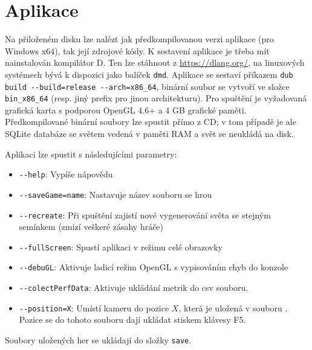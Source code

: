 \vfill


\chapter{Aplikace} \label{ch:app}
Na přiloženém disku lze nalézt jak předkompilovanou verzi aplikace (pro Windows x64), tak její zdrojové kódy. K sestavení aplikace je třeba mít nainstalován kompilátor D. Ten lze stáhnout z \url{https://dlang.org/}, na linuxových systémech bývá k dispozici jako balíček \verb|dmd|. Aplikace se sestaví příkazem \verb|dub build --build=release --arch=x86_64|, binární soubor se vytvoří ve složce \verb|bin_x86_64| (resp. jiný prefix pro jinou architekturu). Pro spuštění je vyžadovaná grafická karta s podporou OpenGL 4.6+ a 4 GB grafické paměti. Předkompilované binární soubory lze spustit přímo z CD; v tom případě je ale SQLite databáze se světem vedená v paměti RAM a svět se neukládá na disk.

Aplikaci lze spustit s následujícími parametry:
\begin{itemize}
	\item \verb|--help|: Vypíše nápovědu
	\item \verb|--saveGame=name|: Nastavuje název souboru se hrou
	\item \verb|--recreate|: Při spuštění zajistí nové vygenerování světa se stejným semínkem (zmizí veškeré zásahy hráče)
	\item \verb|--fullScreen|: Spustí aplikaci v režimu celé obrazovky
	\item \verb|--debuGL|: Aktivuje ladicí režim OpenGL s vypisováním chyb do konzole
	\item \verb|--colectPerfData|: Aktivuje ukládání metrik do csv souboru.
	\item \verb|--position=X|: Umístí kameru do pozice $X$, která je uložená v souboru . Pozice se do tohoto souboru dají ukládat stiskem klávesy F5.
\end{itemize}

Soubory uložených her se ukládají do složky \verb|save|.

